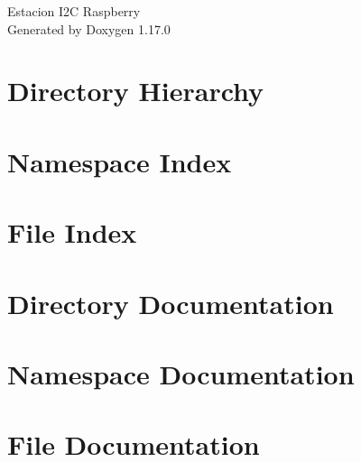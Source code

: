 \documentclass[twoside]{book}
\newcommand{\+}{\discretionary{\mbox{\scriptsize$\hookleftarrow$}}{}{}}
\newcommand{\clearemptydoublepage}{%
    \newpage{\pagestyle{empty}\cleardoublepage}%
  }
\begin{document}
  \raggedbottom
    \hypersetup{pageanchor=false,
                bookmarksnumbered=true,
                pdfencoding=unicode
               }
  \begin{titlepage}
  \vspace*{7cm}
  \begin{center}%
  {\Large Estacion I2\+C Raspberry}\\
  \vspace*{1cm}
  {\large Generated by Doxygen 1.17.0}\\
  \end{center}
  \end{titlepage}
  \clearemptydoublepage
  \tableofcontents
  \clearemptydoublepage
  \hypersetup{pageanchor=true}
\chapter{Directory Hierarchy}

\chapter{Namespace Index}

\chapter{File Index}

\chapter{Directory Documentation}



\chapter{Namespace Documentation}



\chapter{File Documentation}





  \backmatter
  \newpage
  \clearemptydoublepage
  \printindex
\end{document}
